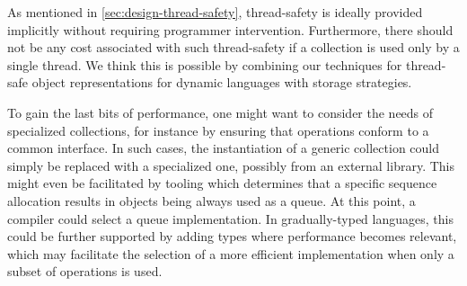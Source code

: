 \documentclass[sigconf, 10pt]{acmart}
\begin{document}

As mentioned in \cref{sec:design-thread-safety},
thread-safety is ideally provided implicitly
without requiring programmer intervention.
Furthermore, there should not be any cost associated with such thread-safety
if a collection is used only by a single thread.
We think this is possible by combining our techniques
for thread-safe object representations\citep{Daloze:2016:TSO}
for dynamic languages with storage strategies. %


To gain the last bits of performance,
one might want to consider the needs of specialized collections,
for instance by ensuring that operations conform to a common interface.
In such cases,
the instantiation of a generic collection could simply be replaced
with a specialized one, possibly from an external library.
This might even be facilitated by tooling
which determines that a specific sequence allocation results in objects being
always used as a queue.
At this point, a compiler could select a queue implementation.
In gradually-typed languages,
this could be further supported by adding types
where performance becomes relevant,
which may facilitate the selection of a more efficient implementation
when only a subset of operations is used.


%
\end{document}
